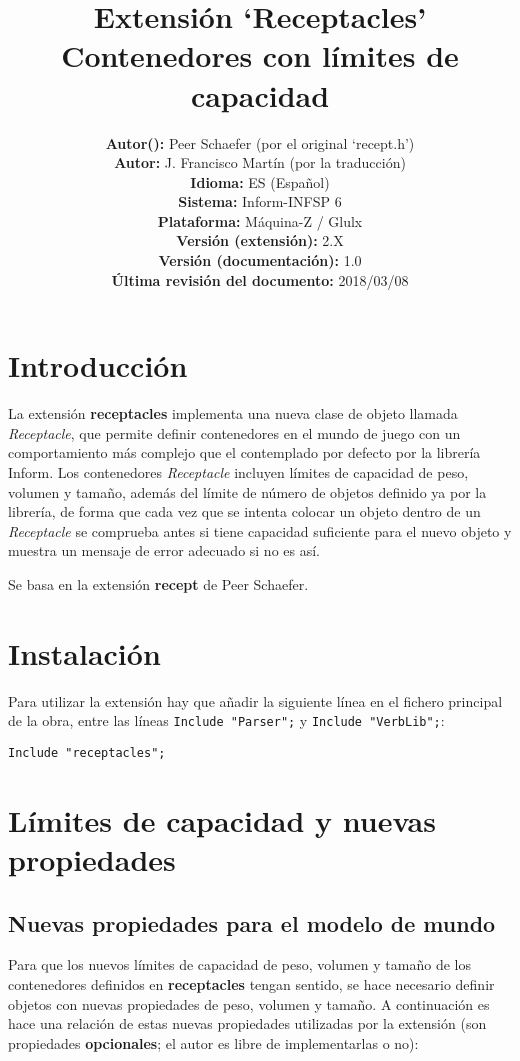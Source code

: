\documentclass[a4paper,12pt]{article}
\title{\vspace{-3cm}Extensión `Receptacles'\\
    \Large{Contenedores con límites de capacidad}}
\author{
	\small{\textbf{Autor():} Peer Schaefer (por el original `recept.h')}\\
	\small{\textbf{Autor:} J. Francisco Martín (por la traducción)}\\
	\small{\textbf{Idioma:} ES (Español)}\\
	\small{\textbf{Sistema:} Inform-INFSP 6}\\
	\small{\textbf{Plataforma:} Máquina-Z / Glulx}\\
	\small{\textbf{Versión (extensión):} 2.X}\\
	\small{\textbf{Versión (documentación):} 1.0}\\
	\small{\textbf{Última revisión del documento:} 2018/03/08}
}
\date{}
\numberwithin{equation}{section}
\begin{document}
\maketitle


\section{Introducción} \label{sec:introduccion}

La extensión \textbf{receptacles} implementa una nueva clase de objeto llamada \emph{Receptacle}, que permite definir contenedores en el mundo de juego con un comportamiento más complejo que el contemplado por defecto por la librería Inform. Los contenedores \emph{Receptacle} incluyen límites de capacidad de peso, volumen y tamaño, además del límite de número de objetos definido ya por la librería, de forma que cada vez que se intenta colocar un objeto dentro de un \emph{Receptacle} se comprueba antes si tiene capacidad suficiente para el nuevo objeto y muestra un mensaje de error adecuado si no es así.

Se basa en la extensión \textbf{recept} de Peer Schaefer.


\section{Instalación} \label{sec:instalacion}

Para utilizar la extensión hay que añadir la siguiente línea en el fichero principal de la obra, entre las líneas \verb|Include "Parser";| y \verb|Include "VerbLib";|:

\begin{verbatim}
Include "receptacles";
\end{verbatim}


\section{Límites de capacidad y nuevas propiedades} \label{sec:limites-y-propiedades}

\subsection{Nuevas propiedades para el modelo de mundo} \label{sec:nuevas-propiedades}

Para que los nuevos límites de capacidad de peso, volumen y tamaño de los contenedores definidos en \textbf{receptacles} tengan sentido, se hace necesario definir objetos con nuevas propiedades de peso, volumen y tamaño. A continuación es hace una relación de estas nuevas propiedades utilizadas por la extensión (son propiedades \textbf{opcionales}; el autor es libre de implementarlas o no):
\end{document}
